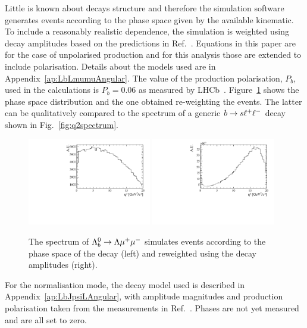 Little is known about \Lb decays structure and therefore the simulation software generates events
according to the phase space given by the available kinematic. To include a reasonably realistic \qsq dependence,
the simulation is weighted using decay amplitudes based on the predictions in Ref.~\cite{Gutsche:2013pp}.
Equations in this paper are for the case of unpolarised \Lb production and for this analysis those are extended to include polarisation.
Details about the models used are in Appendix~\ref{ap:LbLmumuAngular}. The value of the \Lb production polarisation, $P_b$, 
used in the calculations is $P_b = 0.06$ as measured by LHCb~\cite{Aaij:2013oxa}. 
Figure~\ref{fig:decaymodeleffonq2} shows the phase space \qsq distribution and the one obtained re-weighting the events.
The latter can be qualitatively compared to the \qsq spectrum of a generic ${b}\rightarrow{\ensuremath{s}}\ell^+ \ell^-$ decay
shown in Fig.~\ref{fig:q2spectrum}.
%
\begin{figure}
\centering
\includegraphics[width=0.48\textwidth]{Lmumu/figs/Q2_beforemodel.pdf}
\includegraphics[width=0.48\textwidth]{Lmumu/figs/Q2_aftermodel.pdf}
\caption{The \qsq spectrum of ${{\Lambda}^0_{b}}\rightarrow{\ensuremath{\Lambda}}{\ensuremath{\mu^+\mu^-}}$ simulates events according to the
phase space of the decay (left) and reweighted using the decay amplitudes (right).}
\label{fig:decaymodeleffonq2}
\end{figure}
%
For the normalisation mode, the decay model used is described in Appendix~\ref{ap:LbJpsiLAngular},
with amplitude magnitudes and production polarisation taken from the measurements in
Ref.~\cite{Aaij:2013oxa}. Phases are not yet measured and are all set to zero.


